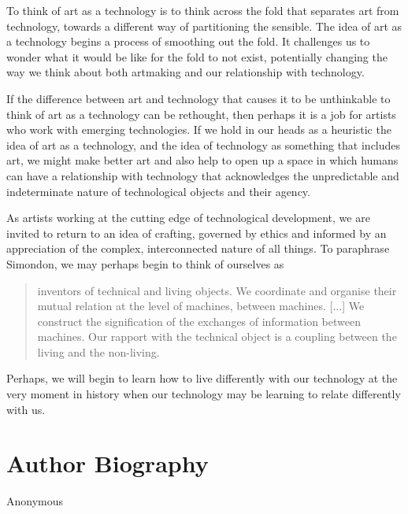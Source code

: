 \documentclass[letterpaper]{article}
\begin{document}
   To think of art as a technology is to think across the fold that separates art from technology, towards a different way of partitioning the sensible. The idea of art as a technology begins a process of smoothing out the fold. It challenges us to wonder what it would be like for the fold to not exist, potentially changing the way we think about both artmaking and our relationship with technology.
    
    If the difference between art and technology that causes it to be unthinkable to think of art as a technology can be rethought, then perhaps it is a job for artists who work with emerging technologies. If we hold in our heads as a heuristic the idea of art as a technology, and the idea of technology as something that includes art, we might make better art and also help to open up a space in which humans can have a relationship with technology that acknowledges the unpredictable and indeterminate nature of technological objects and their agency.
    
    As artists working at the cutting edge of technological development, we are invited to return to an idea of crafting, governed by ethics and informed by an appreciation of the complex, interconnected nature of all things. To paraphrase Simondon, we may perhaps begin to think of ourselves as
    
    \begin{quote}
        inventors of technical and living objects. We coordinate and organise their mutual relation at the level of machines, between machines. [...] We construct the signification of the exchanges of information between machines. Our rapport with the technical object is a coupling between the living and the non-living. \citep[p.xvi]{SimondonOnThMdOfExstncOfTechnclObjcts1980}
    \end{quote}

    Perhaps, we will begin to learn how to live differently with our technology at the very moment in history when our technology may be learning to relate differently with us.
    




\section{Author Biography}

Anonymous 
\end{document}

